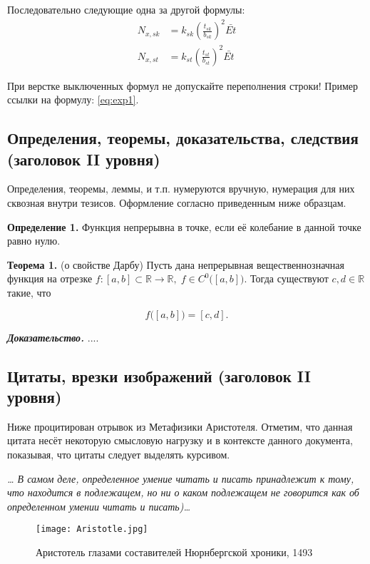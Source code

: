 \documentclass{math-mech-sci}
\begin{document}
Последовательно следующие одна за другой формулы:
\begin{align}
    N_{x,sk} & = k_{sk}\left(\frac{t_{sk}}{b_{sk}}\right)^{2}\bar{Et} \\
    N_{x,st} & = k_{st}\left(\frac{t_{st}}{b_{st}}\right)^{2}\bar{Et}
\end{align}

При верстке выключенных формул не допускайте переполнения строки! Пример ссылки на формулу: \eqref{eq:exp1}.

\subsection*{Определения, теоремы, доказательства, следствия (заголовок II уровня)}

Определения, теоремы, леммы, и т.п. нумеруются вручную, нумерация для них сквозная внутри тезисов. Оформление согласно приведенным ниже образцам.

\textbf{Определение 1.} Функция непрерывна в точке, если её колебание в данной точке равно нулю.

\textbf{Теорема 1.} (о свойстве Дарбу) Пусть дана непрерывная вещественнозначная функция на отрезке
$f:[a,b]\subset \mathbb {R} \to \mathbb {R} ,\;f\in C^{0}{\bigl (}[a,b]{\bigr )}$. Тогда существуют
$ c,d\in \mathbb {R}$ такие, что

\begin{equation*}
    f{\bigl (}[a,b]{\bigr )}=[c,d].
\end{equation*}

\emph{\textbf{Доказательство.}} ....


\subsection*{Цитаты, врезки изображений (заголовок II уровня)}

Ниже процитирован отрывок из Метафизики Аристотеля. Отметим, что
данная цитата несёт некоторую смысловую нагрузку и в контексте данного
документа, показывая, что цитаты следует выделять курсивом.

\emph{\ldots{} В самом деле, определенное умение читать и писать
    принадлежит к тому, что находится в подлежащем, но ни о каком
    подлежащем не говорится как об определенном умении читать и
    писать)\ldots}

\begin{figure}[h]
    \begin{center}
        \texttt{[image: Aristotle.jpg]}
    \end{center}
    \caption{Аристотель глазами составителей Нюрнбергской хроники,
        1493}\label{fig:aristotle}
\end{figure}
\end{document}
